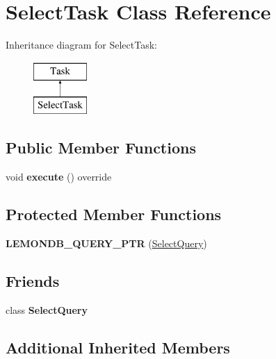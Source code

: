 \hypertarget{class_select_task}{}\section{Select\+Task Class Reference}
\label{class_select_task}
Inheritance diagram for Select\+Task\+:\begin{figure}[H]
\begin{center}
\leavevmode
\includegraphics[height=2.000000cm]{class_select_task}
\end{center}
\end{figure}
\subsection*{Public Member Functions}
\begin{DoxyCompactItemize}
\item 
\mbox{\label{class_select_task_a4704f6ed1fae988f60424a3f72a8f603}} 
void {\bfseries execute} () override
\end{DoxyCompactItemize}
\subsection*{Protected Member Functions}
\begin{DoxyCompactItemize}
\item 
\mbox{\label{class_select_task_a9e0d2a32ef67ec0b365cf555924088d6}} 
{\bfseries L\+E\+M\+O\+N\+D\+B\+\_\+\+Q\+U\+E\+R\+Y\+\_\+\+P\+TR} (\hyperlink{class_select_query}{Select\+Query})
\end{DoxyCompactItemize}
\subsection*{Friends}
\begin{DoxyCompactItemize}
\item 
\mbox{\label{class_select_task_a4f9a39bcb9cbf2e3e2ca21265d5751fe}} 
class {\bfseries Select\+Query}
\end{DoxyCompactItemize}
\subsection*{Additional Inherited Members}



